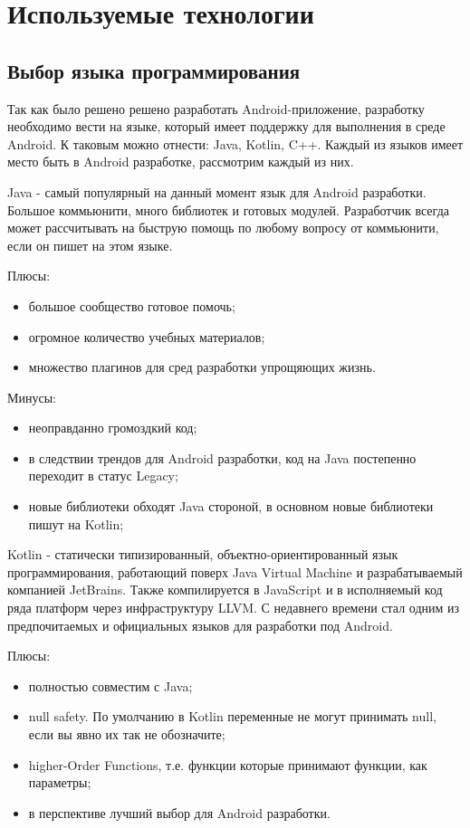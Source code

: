 \section{Используемые технологии}
\label{sec:practice:technology_used}

\subsection{Выбор языка программирования}
Так как было решено решено разработать Android-приложение, разработку необходимо вести на языке, который имеет поддержку для выполнения в среде Android. К таковым можно отнести: Java, Kotlin, C++. Каждый из языков имеет место быть в Android разработке, рассмотрим каждый из них.

Java - самый популярный на данный момент язык для Android разработки. Большое коммьюнити, много библиотек и готовых модулей. Разработчик всегда может рассчитывать на быструю помощь по любому вопросу от коммьюнити, если он пишет на этом языке.

Плюсы:
\begin{itemize}
 \item большое сообщество готовое помочь;
 \item огромное количество учебных материалов;
 \item множество плагинов для сред разработки упрощяющих жизнь.
\end{itemize}

Минусы:
\begin{itemize}
 \item неоправданно громоздкий код;
 \item в следствии трендов для Android разработки, код на Java постепенно переходит в статус Legacy;
 \item новые библиотеки обходят Java стороной, в основном новые библиотеки пишут на Kotlin;
\end{itemize}
 
Kotlin - статически типизированный, объектно-ориентированный язык программирования, работающий поверх Java Virtual Machine и разрабатываемый компанией JetBrains. Также компилируется в JavaScript и в исполняемый код ряда платформ через инфраструктуру LLVM\cite{kotlin1}. С недавнего времени стал одним из предпочитаемых и официальных языков для разработки под Android\cite{web2}.

Плюсы:
\begin{itemize}
 \item полностью совместим с Java;
 \item null safety. По умолчанию в Kotlin переменные не могут принимать null, если вы явно их так не обозначите;
 \item higher-Order Functions, т.е. функции которые принимают функции, как параметры;
 \item в перспективе лучший выбор для Android разработки.
\end{itemize}

